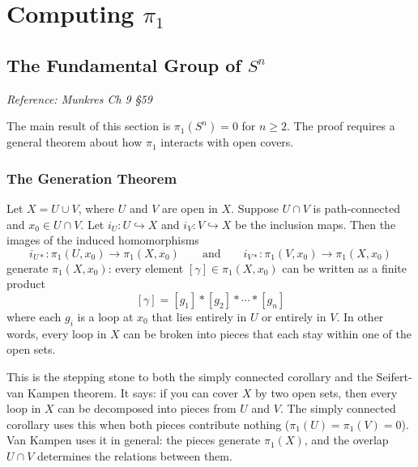 \documentclass[11pt]{report}
\begin{document}
\chapter{Computing \texorpdfstring{$\pi_1$}{π₁}}

\section{The Fundamental Group of $S^n$}

\textit{Reference: Munkres Ch 9 \S 59}

The main result of this section is $\pi_1(S^n) = 0$ for $n \geq 2$. The proof requires a general theorem about how $\pi_1$ interacts with open covers.

\subsection{The Generation Theorem}

\begin{thmbox}
Let $X = U \cup V$, where $U$ and $V$ are open in $X$. Suppose $U \cap V$ is path-connected and $x_0 \in U \cap V$. Let $i_U: U \hookrightarrow X$ and $i_V: V \hookrightarrow X$ be the inclusion maps. Then the images of the induced homomorphisms
\[i_{U*}: \pi_1(U, x_0) \to \pi_1(X, x_0) \qquad \text{and} \qquad i_{V*}: \pi_1(V, x_0) \to \pi_1(X, x_0)\]
generate $\pi_1(X, x_0)$: every element $[\gamma] \in \pi_1(X, x_0)$ can be written as a finite product
\[[\gamma] = [g_1] * [g_2] * \cdots * [g_n]\]
where each $g_i$ is a loop at $x_0$ that lies entirely in $U$ or entirely in $V$. In other words, every loop in $X$ can be broken into pieces that each stay within one of the open sets.
\end{thmbox}

\begin{rembox}
This is the stepping stone to both the simply connected corollary and the Seifert-van Kampen theorem. It says: if you can cover $X$ by two open sets, then every loop in $X$ can be decomposed into pieces from $U$ and $V$. The simply connected corollary uses this when both pieces contribute nothing ($\pi_1(U) = \pi_1(V) = 0$). Van Kampen uses it in general: the pieces generate $\pi_1(X)$, and the overlap $U \cap V$ determines the relations between them.
\end{rembox}
\end{document}
